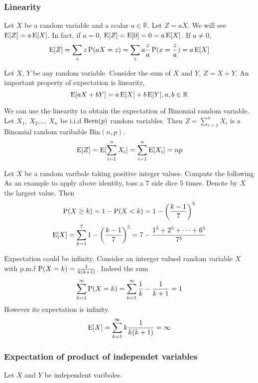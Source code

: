 \subsubsection{Linearity}
Let $X$ be a random variable and a scalar $a\in \mathbb{R}$. Let $Z=aX$. We will see $\E[Z]=a\E[X]$. In fact, if $a=0$, $\E[Z]=\E[0]=0=a\E[X]$. If $a\neq 0$,
$$\E[Z] = \sum_z z\P(aX=z) =\sum_z a \frac{z}{a}\P(x=\frac{z}{a}) = a\E[X]$$

Let $X$, $Y$ be any random variable. Consider the sum of $X$ and $Y$, $Z=X+Y$.
An important property of expectation is linearity, $$\E[aX+bY]=a\E[X]+b\E[Y], a,b \in \mathbb{R}$$

We can use the linearity to obtain the expectation of Binomial random variable. Let $X_1$, $X_2$,\ldots, $X_n$ be i.i.d $\Bern(p)$ random variables. Then $Z=\sum_{i=1}^n X_i$ is a Binomial random varibable $\mathrm{Bin}(n,p)$.
$$\E[Z]=\E[\sum_{i=1}^n X_i] = \sum_{i=1}^n \E[X_i] = np$$

Let $X$ be a random varibale taking positive integer values. Compute the following
As an example to apply above identity, toss a 7 side dice 5 times. Denote by $X$ the largest value. Then
$$\P(X\geq k) = 1-\P(X<k) = 1-\left( \frac{k-1}{7}\right) ^5$$
$$\E[X] = \sum_{k=1}^7 1-\left( \frac{k-1}{7}\right) ^5 = 7-\frac{1^5+2^5+\cdots+6^5}{7^5}$$

Expectation could be infinity. Consider an interger valued random variable $X$ with p.m.f $\P(X=k) = \frac{1}{k(k+1)}$. Indeed the sum 
$$\sum_{k=1}^\infty \P(X=k) = \sum_{k=1}^\infty \frac{1}{k} - \frac{1}{k+1} = 1$$
However its expectation is infinity.
$$\E[X] = \sum_{k=1}^\infty k \frac{1}{k(k+1)} = \infty$$

\subsubsection{Expectation of product of independet variables}
Let $X$ and $Y$ be independent varibales.


